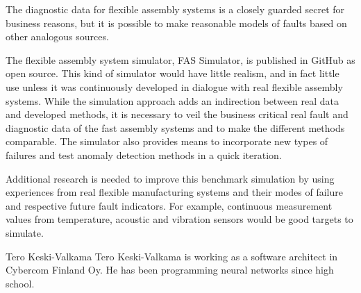 \documentclass[journal]{IEEEtran}
\begin{document}
The diagnostic data for flexible assembly systems is a closely guarded secret for business reasons, but it is possible to make reasonable models
of faults based on other analogous sources.

The flexible assembly system simulator, FAS Simulator, is published in GitHub \cite{FASSimulator} as open source. This kind of simulator would have
little realism, and in fact little use unless it was continuously developed in dialogue with real flexible assembly systems. While the simulation
approach adds an indirection between real data and developed methods, it is necessary to veil the business critical real fault and diagnostic
data of the fast assembly systems and to make the different methods comparable. The simulator also provides means to incorporate new types of
failures and test anomaly detection methods in a quick iteration.

Additional research is needed to improve this benchmark simulation by using experiences from real flexible manufacturing systems and their modes of failure
and respective future fault indicators. For example, continuous measurement values from temperature, acoustic and vibration sensors would be good targets
to simulate.

\appendices




\begin{IEEEbiography}{Tero Keski-Valkama}
Tero Keski-Valkama is working as a software architect in Cybercom Finland Oy. He has been programming neural networks since high school.
\end{IEEEbiography}
\end{document}
